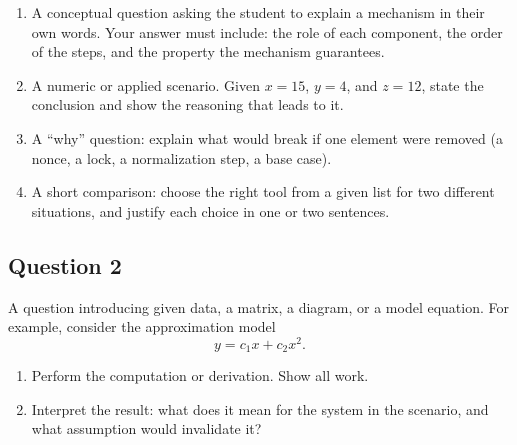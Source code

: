 \begin{enumerate}[label=(\alph*)]

\item A conceptual question asking the student to explain a mechanism
in their own words. Your answer must include: the role of each component,
the order of the steps, and the property the mechanism guarantees.

\vspace{40mm}

\item A numeric or applied scenario. Given $x = 15$, $y = 4$, and $z = 12$,
state the conclusion and show the reasoning that leads to it.

\vspace{40mm}

\item A ``why'' question: explain what would break if one element were removed
(a nonce, a lock, a normalization step, a base case).

\vspace{45mm}

\item A short comparison: choose the right tool from a given list for two
different situations, and justify each choice in one or two sentences.

\vspace{30mm}

\end{enumerate}

\newpage
\subsection*{Question 2}

A question introducing given data, a matrix, a diagram, or a model equation.
For example, consider the approximation model
$$
y = c_1 x + c_2 x^2.
$$

\begin{enumerate}[label=(\alph*)]

\item Perform the computation or derivation. Show all work.

\vspace{60mm}

\item Interpret the result: what does it mean for the system in the scenario,
and what assumption would invalidate it?

\vspace{50mm}

\end{enumerate}


